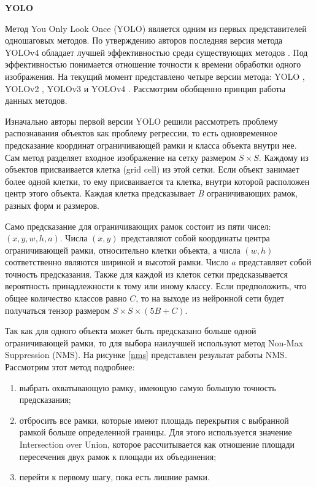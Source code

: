 
\textbf{YOLO}

Метод You Only Look Once (YOLO) является одним из первых представителей одношаговых методов. По утверждению авторов 
последняя версия метода YOLOv4 обладает лучшей эффективностью среди существующих методов \cite{YOLO4}. Под эффективностью
понимается отношение точности к времени обработки одного изображения. На текущий момент представлено четыре версии метода: 
YOLO \cite{YOLO}, YOLOv2 \cite{YOLO2}, YOLOv3 \cite{YOLO3} и YOLOv4 \cite{YOLO4}. Рассмотрим обобщенно принцип работы 
данных методов.

Изначально авторы первой версии YOLO решили рассмотреть проблему распознавания объектов как проблему регрессии, то есть
одновременное предсказание координат ограничивающей рамки и класса объекта внутри нее. Сам метод разделяет входное изображение
на сетку размером $S \times S$. Каждому из объектов присваивается клетка (grid cell) из этой сетки. Если объект занимает 
более одной клетки, то ему присваивается та клетка, внутри которой расположен центр этого объекта. Каждая клетка предсказывает 
\emph{B} ограничивающих рамок, разных форм и размеров. 

Само предсказание для ограничивающих рамок состоит из пяти чисел: $(x, y, w, h, a)$. Числа $(x, y)$ представляют собой координаты центра 
ограничивающей рамки, относительно клетки объекта, а числа $(w, h)$ соответственно являются шириной и высотой рамки. Число  $ a $
представляет собой точность предсказания. Также для каждой из клеток сетки предсказывается вероятность принадлежности к тому 
или иному классу. Если предположить, что общее количество классов равно $ C $, то на выходе из нейронной сети будет 
получаться тензор размером $S \times S \times (5B + C)$.

Так как для одного объекта может быть предсказано больше одной ограничивающей рамки, то для выбора наилучшей используют 
метод Non-Max Suppression (NMS). На рисунке \ref{nms} представлен результат работы NMS. Рассмотрим этот метод подробнее:


\begin{enumerate}
\item выбрать охватывающую рамку, имеющую самую большую точность предсказания;
\item отбросить все рамки, которые имеют площадь перекрытия с выбранной рамкой больше определенной границы.
Для этого используется значение Intersection over Union, которое рассчитывается как отношение площади пересечения 
двух рамок к площади их объединения;
\item перейти к первому шагу, пока есть лишние рамки. 
\end{enumerate}

